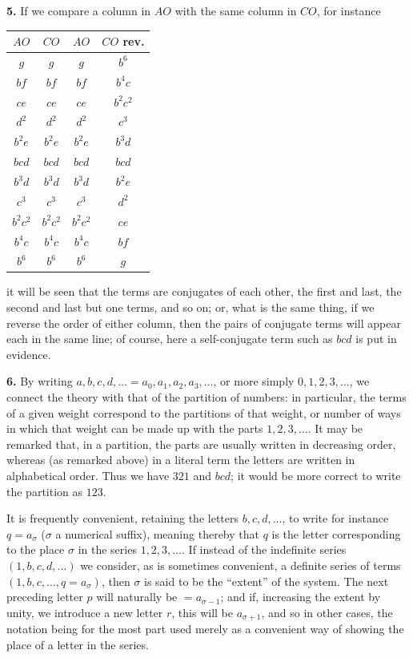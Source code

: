\documentclass[11pt]{article}
\begin{document}
\textbf{5.} If we compare a column in $AO$ with the same column in $CO$, for instance
\begin{center}
\begin{tabular}{cc|cc}
$AO$ & $CO$ & $AO$ & $CO$ rev.\\
\hline
$g$ & $g$ & $g$ & $b^6$ \\
$bf$ & $bf$ & $bf$ & $b^4 c$ \\
$ce$ & $ce$ & $ce$ & $b^2 c^2$ \\
$d^2$ & $d^2$ & $d^2$ & $c^3$ \\
$b^2 e$ & $b^2 e$ & $b^2 e$ & $b^3 d$ \\
$bcd$ & $bcd$ & $bcd$ & $bcd$ \\
$b^3 d$ & $b^3 d$ & $b^3 d$ & $b^2 e$ \\
$c^3$ & $c^3$ & $c^3$ & $d^2$ \\
$b^2 c^2$ & $b^2 c^2$ & $b^2 c^2$ & $ce$ \\
$b^4 c$ & $b^4 c$ & $b^4 c$ & $bf$ \\
$b^6$ & $b^6$ & $b^6$ & $g$ \\
\end{tabular}
\end{center}

it will be seen that the terms are conjugates of each other, the first and last, the second and last but one terms, and so on; or, what is the same thing, if we reverse the order of either column, then the pairs of conjugate terms will appear each in the same line; of course, here a self-conjugate term such as $bcd$ is put in evidence.

\textbf{6.} By writing $a, b, c, d, \ldots = a_0, a_1, a_2, a_3, \ldots$, or more simply $0, 1, 2, 3, \ldots$, we connect the theory with that of the partition of numbers: in particular, the terms of a given weight correspond to the partitions of that weight, or number of ways in which that weight can be made up with the parts $1, 2, 3, \ldots$. It may be remarked that, in a partition, the parts are usually written in decreasing order, whereas (as remarked above) in a literal term the letters are written in alphabetical order. Thus we have $321$ and $bcd$; it would be more correct to write the partition as $123$.

It is frequently convenient, retaining the letters $b, c, d, \ldots$, to write for instance $q = a_\sigma$ ($\sigma$ a numerical suffix), meaning thereby that $q$ is the letter corresponding to the place $\sigma$ in the series $1, 2, 3, \ldots$. If instead of the indefinite series $(1, b, c, d, \ldots)$ we consider, as is sometimes convenient, a definite series of terms $(1, b, c, \ldots, q = a_\sigma)$, then $\sigma$ is said to be the ``extent'' of the system. The next preceding letter $p$ will naturally be $= a_{\sigma-1}$; and if, increasing the extent by unity, we introduce a new letter $r$, this will be $a_{\sigma+1}$, and so in other cases, the notation being for the most part used merely as a convenient way of showing the place of a letter in the series.
\end{document}
